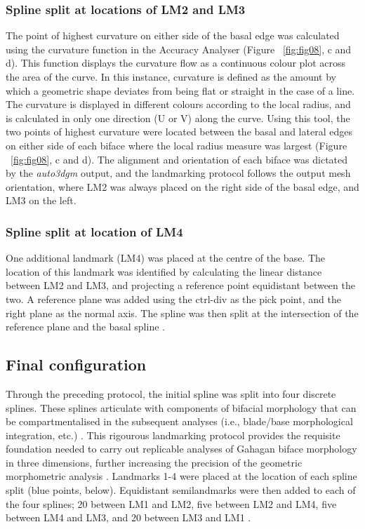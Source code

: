 \documentclass[review]{elsarticle}
\begin{document}
\subsubsection*{Spline split at locations of LM2 and LM3}

The point of highest curvature on either side of the basal edge was calculated using the curvature function in the Accuracy Analyser (Figure ~\ref{fig:fig08}, c and d). This function displays the curvature flow as a continuous colour plot across the area of the curve. In this instance, curvature is defined as the amount by which a geometric shape deviates from being flat or straight in the case of a line. The curvature is displayed in different colours according to the local radius, and is calculated in only one direction (U or V) along the curve. Using this tool, the two points of highest curvature were located between the basal and lateral edges on either side of each biface where the local radius measure was largest (Figure ~\ref{fig:fig08}, c and d). The alignment and orientation of each biface was dictated by the \textit{auto3dgm} output, and the landmarking protocol follows the output mesh orientation, where LM2 was always placed on the right side of the basal edge, and LM3 on the left.

\subsubsection*{Spline split at location of LM4}

One additional landmark (LM4) was placed at the centre of the base. The location of this landmark was identified by calculating the linear distance between LM2 and LM3, and projecting a reference point equidistant between the two. A reference plane was added using the ctrl-div as the pick point, and the right plane as the normal axis. The spline was then split at the intersection of the reference plane and the basal spline \citep{RN20850}.

\subsection*{Final configuration}

Through the preceding protocol, the initial spline was split into four discrete splines. These splines articulate with components of bifacial morphology that can be compartmentalised in the subsequent analyses (i.e., blade/base morphological integration, etc.) \citep{RN20850}. This rigourous landmarking protocol provides the requisite foundation needed to carry out replicable analyses of Gahagan biface morphology in three dimensions, further increasing the precision of the geometric morphometric analysis \citep{RN20850}. Landmarks 1-4 were placed at the location of each spline split (blue points, below). Equidistant semilandmarks were then added to each of the four splines; 20 between LM1 and LM2, five between LM2 and LM4, five between LM4 and LM3, and 20 between LM3 and LM1 \citep{RN20850}.
\end{document}
